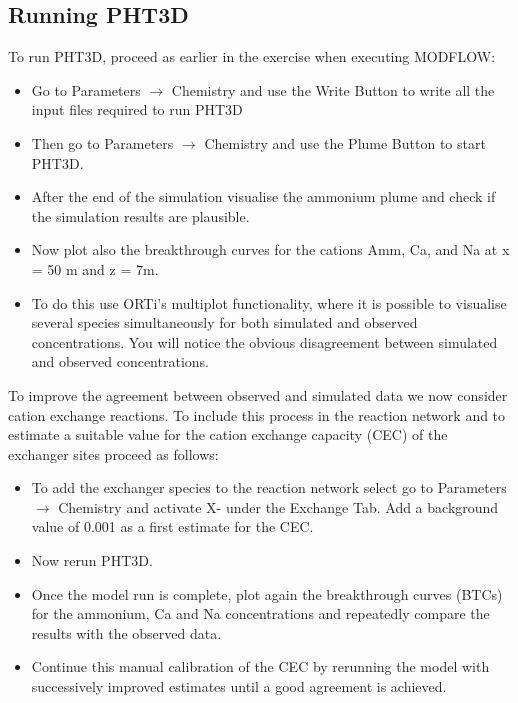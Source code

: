 \subsection[Running PHT3D]{Running PHT3D}

To run PHT3D, proceed as earlier in the exercise when executing MODFLOW:

\begin{itemize}

\item Go to {\color{blue}Parameters} $\rightarrow$ {\color{blue} Chemistry} and use 
the {\color{blue}Write Button} to write all the input files required to run PHT3D

\item Then go to {\color{blue}Parameters} $\rightarrow$ {\color{blue}Chemistry} and use the {\color{blue}Plume Button} to start PHT3D.

\item After the end of the simulation visualise the ammonium plume and check if the 
simulation results are plausible. 

\item Now plot also the breakthrough curves for the cations Amm, Ca, and Na at x = 50 m
and z = 7m. 

\item To do this use ORTi's multiplot functionality, where it is possible to visualise several species simultaneously for both simulated and observed concentrations. You will notice the obvious disagreement between simulated and observed concentrations. 


\end{itemize}

To improve the agreement between observed and simulated data we now consider cation exchange reactions. 
To include this process in the reaction network and to estimate
a suitable value for the cation exchange capacity (CEC) of the exchanger sites 
proceed as follows: 

\begin{itemize}

\item To add the exchanger species to the reaction network
select go to {\color{blue}Parameters} $\rightarrow$ {\color{blue}Chemistry} 
and activate {\color{blue} X-} under the {\color{blue} Exchange Tab}.
Add a background value of 0.001 as a first estimate for the CEC. 

\item Now rerun PHT3D.

\item Once the model run is complete, plot again the breakthrough 
curves (BTCs) for the ammonium, Ca and Na concentrations and repeatedly compare the results 
with the observed data.

\item Continue this manual calibration of the CEC by rerunning the model with successively improved
estimates until a good agreement is achieved.  

\end{itemize}



